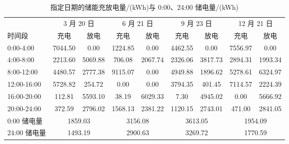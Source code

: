 \documentclass[zihao=-4,a4paper,fontset=none]{ctexart}
\begin{document}
\begin{table}[htbp]
\centering
\caption{指定日期的储能充放电量/(kWh)与 0:00、24:00 储电量/(kWh)}
{\small
\begin{tabular}{lcccccccc}
\toprule
& \multicolumn{2}{c}{3 月 20 日} & \multicolumn{2}{c}{6 月 21 日}
& \multicolumn{2}{c}{9 月 23 日} & \multicolumn{2}{c}{12 月 21 日} \\
\cmidrule(lr){2-3}\cmidrule(lr){4-5}\cmidrule(lr){6-7}\cmidrule(lr){8-9}
时间段 & 充电 & 放电 & 充电 & 放电 & 充电 & 放电 & 充电 & 放电 \\
\midrule
0:00-4:00 & 7044.50 & 0.00 & 1224.85 & 0.00 & 4462.55 & 0.00 & 7556.97 & 0.00 \\
4:00-8:00 & 2213.60 & 5069.88 & 706.08 & 2067.74 & 2326.06 & 3817.73 & 2894.31 & 1993.34 \\
8:00-12:00 & 4480.57 & 2777.38 & 9115.07 & 0.00 & 4949.88 & 1896.62 & 5278.61 & 6324.97 \\
12:00-16:00 & 5728.82 & 254.72 & 0.00 & 0.00 & 3794.35 & 401.45 & 7114.57 & 2224.39 \\
16:00-20:00 & 112.81 & 5593.10 & 38.19 & 6029.33 & 7.30 & 4945.02 & 0.00 & 5666.92 \\
20:00-24:00 & 372.59 & 2796.02 & 1568.13 & 2381.22 & 1120.15 & 2743.01 & 471.00 & 2841.05 \\
\midrule
0:00 储电量 & \multicolumn{2}{c}{1859.03} & \multicolumn{2}{c}{3156.08}
& \multicolumn{2}{c}{3613.05} & \multicolumn{2}{c}{1954.09} \\
24:00 储电量 & \multicolumn{2}{c}{1493.19} & \multicolumn{2}{c}{2900.63}
& \multicolumn{2}{c}{3269.72} & \multicolumn{2}{c}{1770.59} \\
\bottomrule
\end{tabular}}
\label{tab:p3day2}
\end{table}
\end{document}
